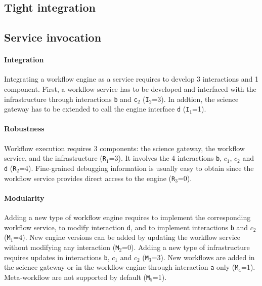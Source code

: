 \documentclass[preprint,3p,twocolumn]{elsarticle}
\begin{document}
\subsection{Tight integration}

\subsection{Service invocation} 

\paragraph{Integration} Integrating a workflow engine as a service
requires to develop 3 interactions and 1 component. First, a workflow
service has to be developed and interfaced with the infrastructure
through interactions \texttt{b} and \texttt{c$_2$}
(\texttt{I$_2$}=3). In addtion, the science gateway has to be extended
to call the engine interface \texttt{d} (\texttt{I$_1$}=1).

\paragraph{Robustness} Workflow execution requires 3 components: the
science gateway, the workflow service, and the infrastructure
(\texttt{R$_1$}=3). It involves the 4 interactions \texttt{b},
\texttt{$c_1$}, \texttt{$c_2$} and \texttt{d}
(\texttt{R$_2$}=4). Fine-grained debugging information is usually easy
to obtain since the workflow service provides direct access to the
engine (\texttt{R$_3$}=0).

\paragraph{Modularity} Adding a new type of workflow engine requires
to implement the corresponding workflow service, to modify interaction
\texttt{d}, and to implement interactions \texttt{b} and
\texttt{$c_2$} (\texttt{M$_1$}=4). New engine versions can be added by
updating the workflow service without modifying any interaction
(\texttt{M$_2$}=0). Adding a new type of infrastructure requires
updates in interactions \texttt{b}, \texttt{$c_1$} and \texttt{$c_2$}
(\texttt{M$_3$}=3). New workflows are added in the science gateway or
in the workflow engine through interaction \texttt{a} only
(\texttt{M$_4$}=1). Meta-workflow are not supported by default
(\texttt{M$_5$}=1).
\end{document}
